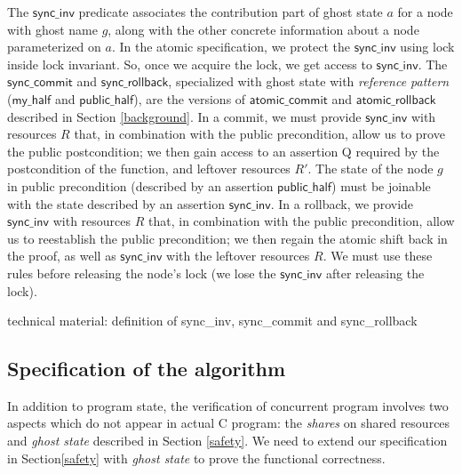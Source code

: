 \documentclass[acmsmall,screen]{acmart}\settopmatter{printfolios=true}
\begin{document}
The $\mathsf{sync\_inv}$ predicate associates the contribution part of ghost state $a$ for a node with ghost name $g$, along with the other concrete information about a node parameterized on $a$. In the atomic specification, we protect the $\mathsf{sync\_inv}$ using lock inside lock invariant. So, once we acquire the lock, we get access to $\mathsf{sync\_inv}$. The $\mathsf{sync\_commit}$ and $\mathsf{sync\_rollback}$, specialized with ghost state with \emph{reference pattern} ($\mathsf{my\_half}$ and $\mathsf{public\_half}$), are the versions of $\mathsf{atomic\_commit}$ and $\mathsf{atomic\_rollback}$ described in Section \ref{background}. In a commit, we must provide $\mathsf{sync\_inv}$ with resources $R$ that, in combination with the public precondition, allow us to prove the public postcondition; we then gain access to an assertion Q required by the postcondition of the function, and leftover resources $R'$. The state of the node $g$ in public precondition (described by an assertion $\mathsf{public\_half}$) must be joinable with the state described by an assertion $\mathsf{sync\_inv}$. In a rollback, we provide $\mathsf{sync\_inv}$ with resources $R$ that, in combination with the public precondition, allow us to reestablish the public precondition; we then regain the atomic shift back in the proof, as well as $\mathsf{sync\_inv}$ with the leftover resources $R$. We must use these rules before releasing the node's lock (we lose the $\mathsf{sync\_inv}$ after releasing the lock).  

technical material: definition of sync\_inv, sync\_commit and sync\_rollback
\subsection{Specification of the algorithm}
In addition to program state, the verification of concurrent program involves two aspects which do not appear in actual C program: the \emph{shares} on shared resources and \emph{ghost state} described in Section \ref{safety}. We need to extend our specification in Section\ref{safety} with \emph{ghost state} to prove the functional correctness.  
\end{document}
